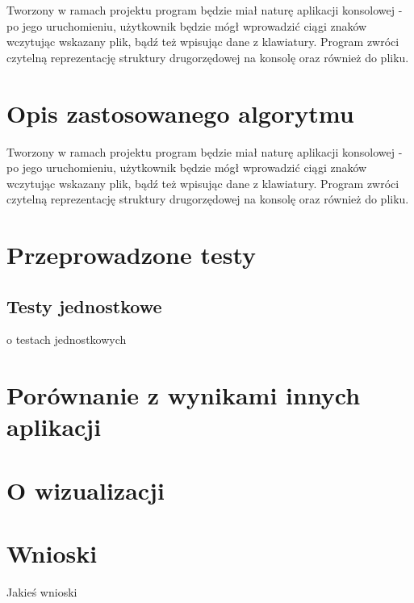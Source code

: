 \documentclass[paper=a4, fontsize=11pt]{scrartcl} %
\numberwithin{equation}{section} %
\numberwithin{figure}{section} %
\numberwithin{table}{section} %
\begin{document}
Tworzony w ramach projektu program będzie miał naturę aplikacji konsolowej - po jego uruchomieniu, użytkownik będzie mógł wprowadzić ciągi znaków wczytując wskazany plik, bądź też wpisując dane z klawiatury. 
Program zwróci czytelną reprezentację struktury drugorzędowej na konsolę oraz również do pliku.


\section{Opis zastosowanego algorytmu}

Tworzony w ramach projektu program będzie miał naturę aplikacji konsolowej - po jego uruchomieniu, użytkownik będzie mógł wprowadzić ciągi znaków wczytując wskazany plik, bądź też wpisując dane z klawiatury. 
Program zwróci czytelną reprezentację struktury drugorzędowej na konsolę oraz również do pliku.



\section{Przeprowadzone testy}

\subsection{Testy jednostkowe}
o testach jednostkowych 

 

\section{Porównanie z wynikami innych aplikacji}

 

\section{O wizualizacji}

\section{Wnioski}

Jakieś wnioski

\renewcommand{\refname}{\normalfont\selectfont\normalsize Literatura i źródła} 
\end{document}

